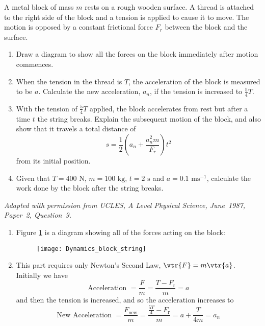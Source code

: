
\begin{problem}[A1987PSIIQ9a] %
{A metal block of mass $m$ rests on a rough wooden surface. A thread is attached to the right side of the block and a tension is applied to cause it to move. The motion is opposed by a constant frictional force $F_{r}$ between the block and the surface.
\begin{enumerate}
	\item Draw a diagram to show all the forces on the block immediately after motion commences.
	\item When the tension in the thread is $T$, the acceleration of the block is measured to be $a$. Calculate the new acceleration, $a_{n}$, if the tension is increased to $\frac{5}{4}T$.
	\item With the tension of $\frac{5}{4}T$ applied, the block accelerates from rest but after a time $t$ the string breaks. Explain the subsequent motion of the block, and also show that it travels a total distance of \begin{equation*} s = \frac{1}{2} \left(a_{n} + \frac{a_{n}^{2}m}{F_{r}} \right)t^{2}\end{equation*} from its initial position.
	\item Given that $T = 400 \textrm{ N}$, $m = 100 \textrm{ kg}$, $t = 2 \textrm{ s}$ and $a = 0.1 \textrm{ ms}^{-1}$, calculate the work done by the block after the string breaks.
\end{enumerate}
}
{\textit{Adapted with permission from UCLES, A Level Physical Science, June~1987, Paper~2, Question~9.}}
{\begin{enumerate}
	\item Figure \ref{fig:Dynamics_block_string} is a diagram showing all of the forces acting on the block:
\begin{figure}[h]
\centering
\texttt{[image: Dynamics\_block\_string]}
\caption{}
\label{fig:Dynamics_block_string}
\end{figure}
	\item This part requires only Newton's Second Law, $\vtr{F} = m\vtr{a}$. Initially we have 
	\begin{equation*} \textrm{Acceleration } = \frac{F}{m} = \frac{T - F_{\textrm{r}}}{m} = a \end{equation*}
and then the tension is increased, and so the acceleration increases to
	\begin{equation*} \textrm{New Acceleration } = \frac{F_{\textrm{new}}}{m} = \frac{\frac{5T}{4} - F_{\textrm{r}}}{m} = a + \frac{T}{4m} = a_{n} \end{equation*}
	

\end{enumerate}}
\end{problem}
